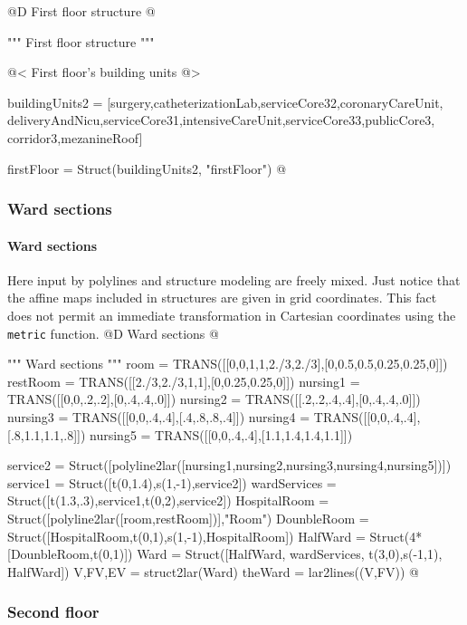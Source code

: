 \documentclass[11pt,oneside]{article}    %
\begin{document}
@D First floor structure
@{""" First floor structure """

@< First floor's building units @>

buildingUnits2 = [surgery,catheterizationLab,serviceCore32,coronaryCareUnit,
    deliveryAndNicu,serviceCore31,intensiveCareUnit,serviceCore33,publicCore3,
    corridor3,mezanineRoof]
    
firstFloor = Struct(buildingUnits2, "firstFloor")
@}


\subsubsection{Ward sections}
\paragraph{Ward sections}
Here input by polylines and structure modeling are freely mixed. Just notice that
the affine maps included in structures are given in grid coordinates. This fact 
does not permit an immediate transformation in Cartesian coordinates using the \texttt{metric}
function.
@D Ward sections
@{""" Ward sections """
room = TRANS([[0,0,1,1,2./3,2./3],[0,0.5,0.5,0.25,0.25,0]])
restRoom = TRANS([[2./3,2./3,1,1],[0,0.25,0.25,0]])
nursing1 = TRANS([[0,0,.2,.2],[0,.4,.4,.0]])
nursing2 = TRANS([[.2,.2,.4,.4],[0,.4,.4,.0]])
nursing3 = TRANS([[0,0,.4,.4],[.4,.8,.8,.4]])
nursing4 = TRANS([[0,0,.4,.4],[.8,1.1,1.1,.8]])
nursing5 = TRANS([[0,0,.4,.4],[1.1,1.4,1.4,1.1]])

service2 = Struct([polyline2lar([nursing1,nursing2,nursing3,nursing4,nursing5])])
service1 = Struct([t(0,1.4),s(1,-1),service2])
wardServices = Struct([t(1.3,.3),service1,t(0,2),service2])
HospitalRoom = Struct([polyline2lar([room,restRoom])],"Room")
DounbleRoom =  Struct([HospitalRoom,t(0,1),s(1,-1),HospitalRoom])
HalfWard = Struct(4*[DounbleRoom,t(0,1)])
Ward = Struct([HalfWard, wardServices, t(3,0),s(-1,1), HalfWard])
V,FV,EV = struct2lar(Ward)
theWard = lar2lines((V,FV))
@}


\subsubsection{Second floor}
\end{document}
